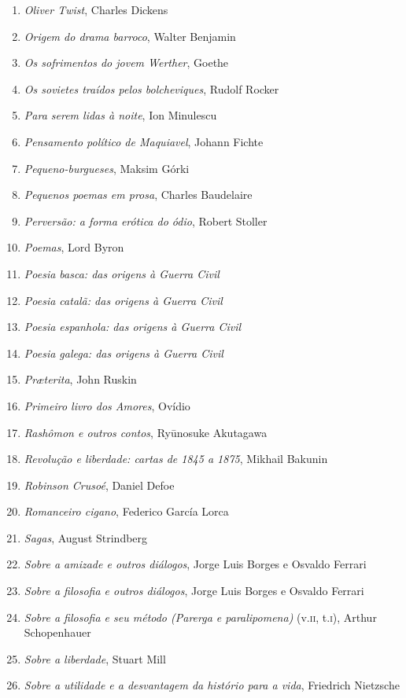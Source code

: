 \begin{enumerate}
\item \textit{Oliver Twist}, Charles Dickens
\item \textit{Origem do drama barroco}, Walter Benjamin
\item \textit{Os sofrimentos do jovem Werther}, Goethe
\item \textit{Os sovietes traídos pelos bolcheviques}, Rudolf Rocker
\item \textit{Para serem lidas à noite}, Ion Minulescu
\item \textit{Pensamento político de Maquiavel}, Johann Fichte
\item \textit{Pequeno-burgueses}, Maksim Górki
\item \textit{Pequenos poemas em prosa}, Charles Baudelaire
\item \textit{Perversão: a forma erótica do ódio}, Robert Stoller
\item \textit{Poemas}, Lord Byron
\item \textit{Poesia basca: das origens à Guerra Civil} 
\item \textit{Poesia catalã: das origens à Guerra Civil} 
\item \textit{Poesia espanhola: das origens à Guerra Civil} 
\item \textit{Poesia galega: das origens à Guerra Civil} 
\item \textit{Pr\ae terita}, John Ruskin
\item \textit{Primeiro livro dos Amores}, Ovídio
\item \textit{Rashômon e outros contos}, Ryūnosuke Akutagawa
\item \textit{Revolução e liberdade: cartas de 1845 a 1875}, Mikhail Bakunin
\item \textit{Robinson Crusoé}, Daniel Defoe
\item \textit{Romanceiro cigano}, Federico García Lorca
\item \textit{Sagas}, August Strindberg
\item \textit{Sobre a amizade e outros diálogos}, Jorge Luis Borges e Osvaldo Ferrari
\item \textit{Sobre a filosofia e outros diálogos}, Jorge Luis Borges e Osvaldo Ferrari
\item \textit{Sobre a filosofia e seu método (Parerga e paralipomena)} (v.\textsc{ii}, t.\textsc{i}), Arthur Schopenhauer 
\item \textit{Sobre a liberdade}, Stuart Mill
\item \textit{Sobre a utilidade e a desvantagem da histório para a vida}, Friedrich Nietzsche

\end{enumerate}
